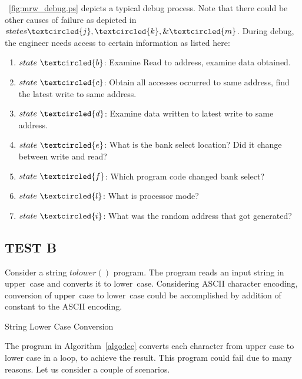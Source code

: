 \figurename{~\ref{fig:mrw_debug.ps}} depicts a typical debug process. Note that there could be other causes of failure as depicted in $states \textcircled{j}, \textcircled{k}, \& \textcircled{m}$. During debug, the engineer needs access to certain information as listed here:
\begin{enumerate}
\item $state~\textcircled{b}$: Examine Read to address, examine data obtained.
\item $state~\textcircled{c}$: Obtain all accesses occurred to same address, find the latest write to same address.
\item $state~\textcircled{d}$: Examine data written to latest write to same address.
\item $state~\textcircled{e}$: What is the bank select location? Did it change between write and read?
\item $state~\textcircled{f}$: Which program code changed bank select?
\item $state~\textcircled{l}$: What is processor mode?
\item $state~\textcircled{i}$: What was the random address that got generated?
\end{enumerate}

\subsection {TEST B}
\label{case:testb}
Consider a string $tolower()$ program. The program reads an input string in upper~case and converts it to lower~case. Considering ASCII character encoding, conversion of upper~case to lower~case could be accomplished by addition of constant to the ASCII encoding.



\IncMargin{1em}
\begin{algorithm}[h]
\DontPrintSemicolon
{}

\BlankLine
 \caption{String Lower Case Conversion}
\label{algo:lcc}
\end{algorithm}\DecMargin{1em}


The program in Algorithm~\ref{algo:lcc} converts each character from upper case to lower case in a loop, to achieve the result. This program could fail due to many reasons. Let us consider a couple of scenarios.

